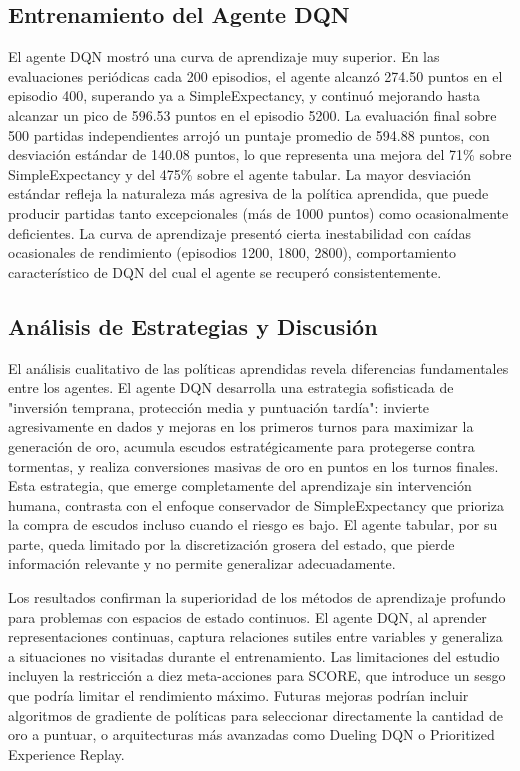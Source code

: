 \documentclass[12pt,a4paper]{article}
\begin{document}
\subsection{Entrenamiento del Agente DQN}

El agente DQN mostró una curva de aprendizaje muy superior. En las evaluaciones periódicas cada 200 episodios, el agente alcanzó 274.50 puntos en el episodio 400, superando ya a SimpleExpectancy, y continuó mejorando hasta alcanzar un pico de 596.53 puntos en el episodio 5200. La evaluación final sobre 500 partidas independientes arrojó un puntaje promedio de 594.88 puntos, con desviación estándar de 140.08 puntos, lo que representa una mejora del 71\% sobre SimpleExpectancy y del 475\% sobre el agente tabular. La mayor desviación estándar refleja la naturaleza más agresiva de la política aprendida, que puede producir partidas tanto excepcionales (más de 1000 puntos) como ocasionalmente deficientes. La curva de aprendizaje presentó cierta inestabilidad con caídas ocasionales de rendimiento (episodios 1200, 1800, 2800), comportamiento característico de DQN del cual el agente se recuperó consistentemente.

\subsection{Análisis de Estrategias y Discusión}

El análisis cualitativo de las políticas aprendidas revela diferencias fundamentales entre los agentes. El agente DQN desarrolla una estrategia sofisticada de "inversión temprana, protección media y puntuación tardía": invierte agresivamente en dados y mejoras en los primeros turnos para maximizar la generación de oro, acumula escudos estratégicamente para protegerse contra tormentas, y realiza conversiones masivas de oro en puntos en los turnos finales. Esta estrategia, que emerge completamente del aprendizaje sin intervención humana, contrasta con el enfoque conservador de SimpleExpectancy que prioriza la compra de escudos incluso cuando el riesgo es bajo. El agente tabular, por su parte, queda limitado por la discretización grosera del estado, que pierde información relevante y no permite generalizar adecuadamente.

Los resultados confirman la superioridad de los métodos de aprendizaje profundo para problemas con espacios de estado continuos. El agente DQN, al aprender representaciones continuas, captura relaciones sutiles entre variables y generaliza a situaciones no visitadas durante el entrenamiento. Las limitaciones del estudio incluyen la restricción a diez meta-acciones para SCORE, que introduce un sesgo que podría limitar el rendimiento máximo. Futuras mejoras podrían incluir algoritmos de gradiente de políticas para seleccionar directamente la cantidad de oro a puntuar, o arquitecturas más avanzadas como Dueling DQN o Prioritized Experience Replay.
\end{document}
